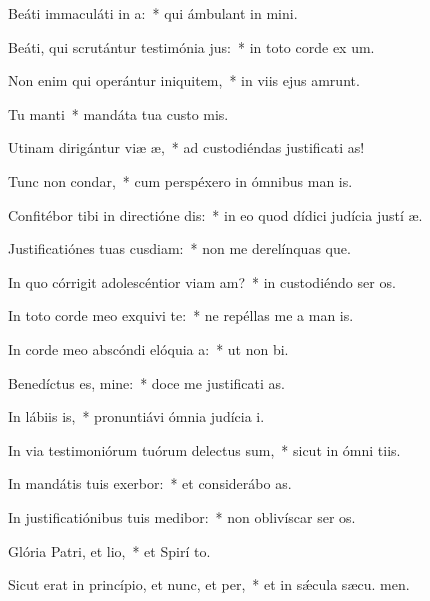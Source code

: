 \item Beáti immaculáti in a:~* qui ámbulant in  mini.
\item Beáti, qui scrutántur testimónia jus:~* in toto corde ex um.
\item Non enim qui operántur iniquitem,~* in viis ejus amrunt.
\item Tu manti~* mandáta tua custo mis.
\item Utinam dirigántur viæ æ,~* ad custodiéndas justificati as!
\item Tunc non condar,~* cum perspéxero in ómnibus man is.
\item Confitébor tibi in directióne dis:~* in eo quod dídici judícia justí æ.
\item Justificatiónes tuas cusdiam:~* non me derelínquas que.
\item In quo córrigit adolescéntior viam am?~* in custodiéndo ser os.
\item In toto corde meo exquivi te:~* ne repéllas me a man is.
\item In corde meo abscóndi elóquia a:~* ut non  bi.
\item Benedíctus es, mine:~* doce me justificati as.
\item In lábiis is,~* pronuntiávi ómnia judícia  i.
\item In via testimoniórum tuórum delectus sum,~* sicut in ómni tiis.
\item In mandátis tuis exerbor:~* et considerábo  as.
\item In justificatiónibus tuis medibor:~* non oblivíscar ser os.
\item Glória Patri, et lio,~* et Spirí to.
\item Sicut erat in princípio, et nunc, et per,~* et in sǽcula sæcu. men.
